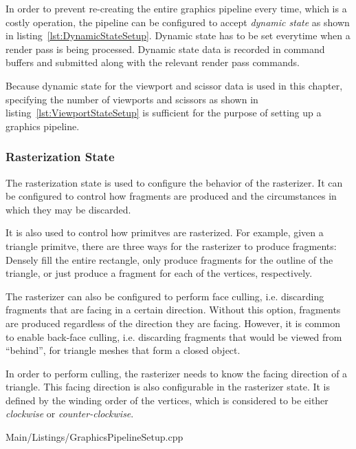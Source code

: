         In order to prevent re-creating the entire graphics pipeline every time, which is a costly operation, the pipeline can be configured to accept \textit{dynamic state} as shown in listing~\ref{lst:DynamicStateSetup}.
        Dynamic state has to be set everytime when a render pass is being processed.
        Dynamic state data is recorded in command buffers and submitted along with the relevant render pass commands.

        Because dynamic state for the viewport and scissor data is used in this chapter, specifying the number of viewports and scissors as shown in listing~\ref{lst:ViewportStateSetup} is sufficient for the purpose of setting up a graphics pipeline.

      \subsubsection{Rasterization State}
        The rasterization state is used to configure the behavior of the rasterizer.
        It can be configured to control how fragments are produced and the circumstances in which they may be discarded.

        It is also used to control how primitves are rasterized.
        For example, given a triangle primitve, there are three ways for the rasterizer to produce fragments: Densely fill the entire rectangle, only produce fragments for the outline of the triangle, or just produce a fragment for each of the vertices, respectively.

        The rasterizer can also be configured to perform face culling, i.e. discarding fragments that are facing in a certain direction.
        Without this option, fragments are produced regardless of the direction they are facing.
        However, it is common to enable back-face culling, i.e. discarding fragments that would be viewed from ``behind'', for triangle meshes that form a closed object.

        In order to perform culling, the rasterizer needs to know the facing direction of a triangle.
        This facing direction is also configurable in the rasterizer state.
        It is defined by the winding order of the vertices, which is considered to be either \textit{clockwise} or \textit{counter-clockwise}.

        
        {Main/Listings/GraphicsPipelineSetup.cpp}

